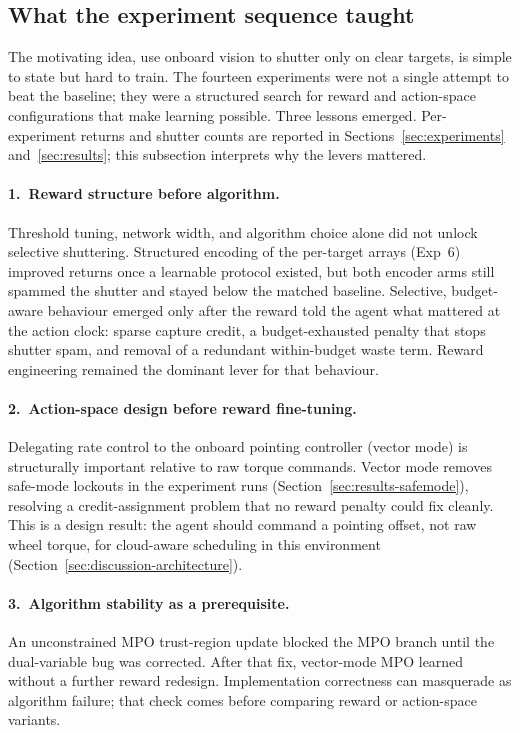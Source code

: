 \label{sec:discussion}

\subsection{What the experiment sequence taught}
\label{sec:discussion-arc}

The motivating idea, use onboard vision to shutter only on clear targets, is simple to state but hard to train.
The fourteen experiments were not a single attempt to beat the baseline; they were a structured search for reward and action-space configurations that make learning possible.
Three lessons emerged.
Per-experiment returns and shutter counts are reported in Sections~\ref{sec:experiments} and~\ref{sec:results}; this subsection interprets why the levers mattered.

\paragraph{1.\ Reward structure before algorithm.}
Threshold tuning, network width, and algorithm choice alone did not unlock selective shuttering.
Structured encoding of the per-target arrays (Exp~6) improved returns once a learnable protocol existed, but both encoder arms still spammed the shutter and stayed below the matched baseline.
Selective, budget-aware behaviour emerged only after the reward told the agent what mattered at the action clock: sparse capture credit, a budget-exhausted penalty that stops shutter spam, and removal of a redundant within-budget waste term.
Reward engineering remained the dominant lever for that behaviour.

\paragraph{2.\ Action-space design before reward fine-tuning.}
Delegating rate control to the onboard pointing controller (vector mode) is structurally important relative to raw torque commands.
Vector mode removes safe-mode lockouts in the experiment runs (Section~\ref{sec:results-safemode}), resolving a credit-assignment problem that no reward penalty could fix cleanly.
This is a design result: the agent should command a pointing offset, not raw wheel torque, for cloud-aware scheduling in this environment (Section~\ref{sec:discussion-architecture}).

\paragraph{3.\ Algorithm stability as a prerequisite.}
An unconstrained MPO trust-region update blocked the MPO branch until the dual-variable bug was corrected.
After that fix, vector-mode MPO learned without a further reward redesign.
Implementation correctness can masquerade as algorithm failure; that check comes before comparing reward or action-space variants.

